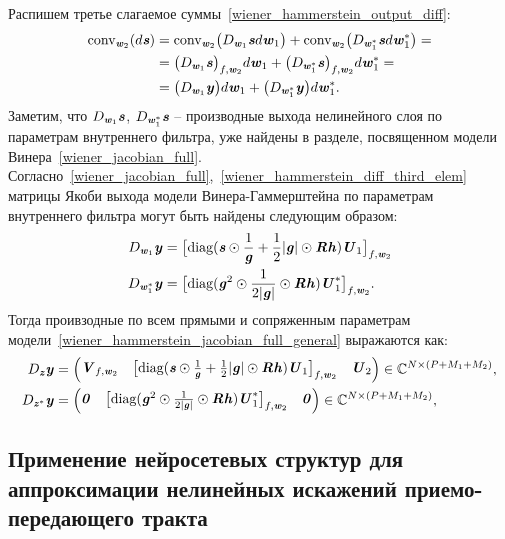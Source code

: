Распишем третье слагаемое суммы~\eqref{wiener_hammerstein_output_diff}:
\begin{align}
	\text{conv}_{\textbf{\textit{w}}_2}(d\textbf{\textit{s}})&=\text{conv}_{\textbf{\textit{w}}_2}\big(D_{\textbf{\textit{w}}_1}\textbf{\textit{s}}d\textbf{\textit{w}}_1\big)+\text{conv}_{\textbf{\textit{w}}_2}\big(D_{\textbf{\textit{w}}_1^*}\textbf{\textit{s}}d\textbf{\textit{w}}_1^*\big)= \nonumber \\
	&=\big(D_{\textbf{\textit{w}}_1}\textbf{\textit{s}}\big)_{f, \textbf{\textit{w}}_2}d\textbf{\textit{w}}_1+\big(D_{\textbf{\textit{w}}_1^*}\textbf{\textit{s}}\big)_{f, \textbf{\textit{w}}_2}d\textbf{\textit{w}}_1^*= \nonumber \\
	&=\big(D_{\textbf{\textit{w}}_1}\textbf{\textit{y}}\big)d\textbf{\textit{w}}_1+\big(D_{\textbf{\textit{w}}_1^*}\textbf{\textit{y}}\big)d\textbf{\textit{w}}_1^*.
	\label{wiener_hammerstein_diff_third_elem}
\end{align}
Заметим, что $D_{\textbf{\textit{w}}_1}\textbf{\textit{s}}$, $D_{\textbf{\textit{w}}_1^*}\textbf{\textit{s}}$ -- производные выхода нелинейного слоя по параметрам внутреннего фильтра, уже найдены в разделе, посвященном модели Винера~\eqref{wiener_jacobian_full}. Согласно~\eqref{wiener_jacobian_full},~\eqref{wiener_hammerstein_diff_third_elem} матрицы Якоби выхода модели Винера-Гаммерштейна по параметрам внутреннего фильтра могут быть найдены следующим образом:
\begin{align}
	D_{\textbf{\textit{w}}_1}\textbf{\textit{y}}&=\big[\text{diag}(\textbf{\textit{s}}\odot\frac{1}{\textbf{\textit{g}}}+\frac{1}{2}|\textbf{\textit{g}}|\odot\textbf{\textit{R}}\textbf{\textit{h}})\textbf{\textit{U}}_1\big]_{f, \textbf{\textit{w}}_2} \nonumber \\
	D_{\textbf{\textit{w}}_1^*}\textbf{\textit{y}}&=\big[\text{diag}(\textbf{\textit{g}}^2\odot\frac{1}{2|\textbf{\textit{g}}|}\odot\textbf{\textit{R}}\textbf{\textit{h}})\textbf{\textit{U}}_1^*\big]_{f, \textbf{\textit{w}}_2}.
	\label{wiener_hammerstein_deriv_fir_input}
\end{align}
Тогда проивзодные по всем прямыми и сопряженным параметрам модели~\eqref{wiener_hammerstein_jacobian_full_general} выражаются как:
\begin{align}
	D_{\textbf{\textit{z}}}\textbf{\textit{y}}&=\begin{pmatrix}
		\textbf{\textit{V}}_{f, \textbf{\textit{w}}_2} & \big[\text{diag}(\textbf{\textit{s}}\odot\frac{1}{\textbf{\textit{g}}}+\frac{1}{2}|\textbf{\textit{g}}|\odot\textbf{\textit{R}}\textbf{\textit{h}})\textbf{\textit{U}}_1\big]_{f, \textbf{\textit{w}}_2} & \textbf{\textit{U}}_2
	\end{pmatrix}
	\in\mathbb{C}^{N\times(P+M_1+M_2)}, \nonumber \\
	D_{\textbf{\textit{z}}^*}\textbf{\textit{y}}&=\begin{pmatrix}
		\textbf{\textit{0}} &\big[\text{diag}(\textbf{\textit{g}}^2\odot\frac{1}{2|\textbf{\textit{g}}|}\odot\textbf{\textit{R}}\textbf{\textit{h}})\textbf{\textit{U}}_1^*\big]_{f, \textbf{\textit{w}}_2} & \textbf{\textit{0}}
	\end{pmatrix}
	\in\mathbb{C}^{N\times(P+M_1+M_2)},
	\label{wiener_hammerstein_jacobian_full}
\end{align}

\subsection{Применение нейросетевых структур для аппроксимации нелинейных искажений приемо-передающего тракта} \label{subsec:neural_mlp}

